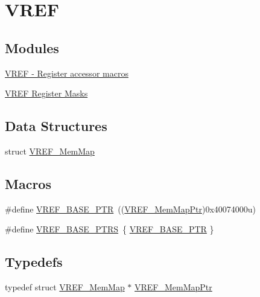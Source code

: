 \hypertarget{group___v_r_e_f___peripheral}{}\section{V\+R\+E\+F}
\label{group___v_r_e_f___peripheral}
\subsection*{Modules}
\begin{DoxyCompactItemize}
\item 
\hyperlink{group___v_r_e_f___register___accessor___macros}{V\+R\+E\+F -\/ Register accessor macros}
\item 
\hyperlink{group___v_r_e_f___register___masks}{V\+R\+E\+F Register Masks}
\end{DoxyCompactItemize}
\subsection*{Data Structures}
\begin{DoxyCompactItemize}
\item 
struct \hyperlink{struct_v_r_e_f___mem_map}{V\+R\+E\+F\+\_\+\+Mem\+Map}
\end{DoxyCompactItemize}
\subsection*{Macros}
\begin{DoxyCompactItemize}
\item 
\#define \hyperlink{group___v_r_e_f___peripheral_ga53dba79dbefcdd6f788740a6d0caa57d}{V\+R\+E\+F\+\_\+\+B\+A\+S\+E\+\_\+\+P\+T\+R}~((\hyperlink{group___v_r_e_f___peripheral_ga0730b01086e1d40975ad4e6c1d101b7c}{V\+R\+E\+F\+\_\+\+Mem\+Map\+Ptr})0x40074000u)
\item 
\#define \hyperlink{group___v_r_e_f___peripheral_ga3eb17aee5de4a519ee18fe763e43865b}{V\+R\+E\+F\+\_\+\+B\+A\+S\+E\+\_\+\+P\+T\+R\+S}~\{ \hyperlink{group___v_r_e_f___peripheral_ga53dba79dbefcdd6f788740a6d0caa57d}{V\+R\+E\+F\+\_\+\+B\+A\+S\+E\+\_\+\+P\+T\+R} \}
\end{DoxyCompactItemize}
\subsection*{Typedefs}
\begin{DoxyCompactItemize}
\item 
typedef struct \hyperlink{struct_v_r_e_f___mem_map}{V\+R\+E\+F\+\_\+\+Mem\+Map} $\ast$ \hyperlink{group___v_r_e_f___peripheral_ga0730b01086e1d40975ad4e6c1d101b7c}{V\+R\+E\+F\+\_\+\+Mem\+Map\+Ptr}
\end{DoxyCompactItemize}



